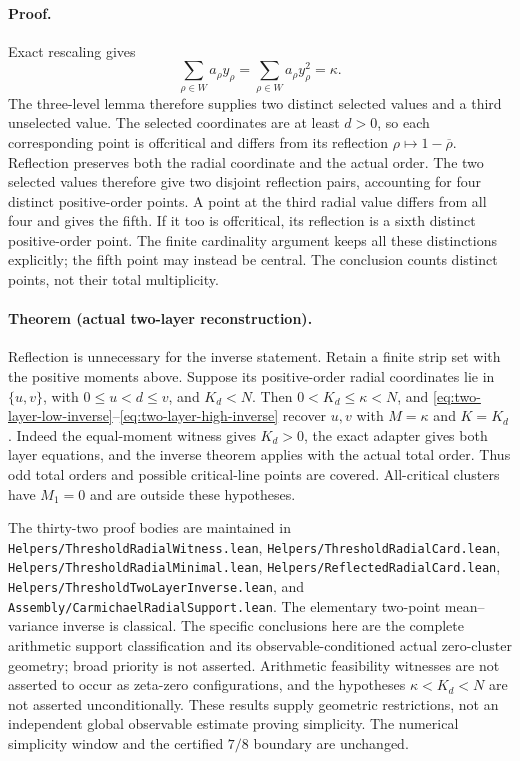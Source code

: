 \paragraph{Proof.}
Exact rescaling gives
\[
 \sum_{\rho\in W}a_\rho y_\rho
 =\sum_{\rho\in W}a_\rho y_\rho^2=\kappa.
\]
The three-level lemma therefore supplies two distinct selected values
and a third unselected value.  The selected coordinates are at least
\(d>0\), so each corresponding point is offcritical and differs from
its reflection \(\rho\mapsto1-\overline\rho\).  Reflection preserves
both the radial coordinate and the actual order.  The two selected values
therefore give two disjoint reflection pairs, accounting for four distinct
positive-order points.  A point at the third radial value differs from all
four and gives the fifth.  If it too is offcritical, its reflection is a
sixth distinct positive-order point.  The finite cardinality argument keeps
all these distinctions explicitly; the fifth point may instead be central.
The conclusion counts distinct points, not their total multiplicity.

\paragraph{Theorem (actual two-layer reconstruction).}
Reflection is unnecessary for the inverse statement.  Retain a finite strip
set with the positive moments above.  Suppose its positive-order radial
coordinates lie in \(\{u,v\}\), with \(0\le u<d\le v\), and
\(K_d<N\).  Then \(0<K_d\le\kappa<N\), and
\eqref{eq:two-layer-low-inverse}--\eqref{eq:two-layer-high-inverse}
recover \(u,v\) with \(M=\kappa\) and \(K=K_d\).
Indeed the equal-moment witness gives \(K_d>0\), the exact adapter gives
both layer equations, and the inverse theorem applies with the actual total
order.  Thus odd total orders and possible critical-line points are covered.
All-critical clusters have \(M_1=0\) and are outside these hypotheses.

The thirty-two proof bodies are maintained in
\texttt{Helpers/ThresholdRadialWitness.lean},
\texttt{Helpers/ThresholdRadialCard.lean},
\texttt{Helpers/ThresholdRadialMinimal.lean},
\texttt{Helpers/ReflectedRadialCard.lean},
\texttt{Helpers/ThresholdTwoLayerInverse.lean}, and
\texttt{Assembly/CarmichaelRadialSupport.lean}.
The elementary two-point mean--variance inverse is classical.  The specific
conclusions here are the complete arithmetic support classification and its
observable-conditioned actual zero-cluster geometry; broad priority is not
asserted.  Arithmetic feasibility witnesses are not asserted to occur as
zeta-zero configurations, and the hypotheses \(\kappa<K_d<N\) are not
asserted unconditionally.  These results supply geometric restrictions, not
an independent global observable estimate proving simplicity.  The numerical
simplicity window and the certified \(7/8\) boundary are unchanged.

